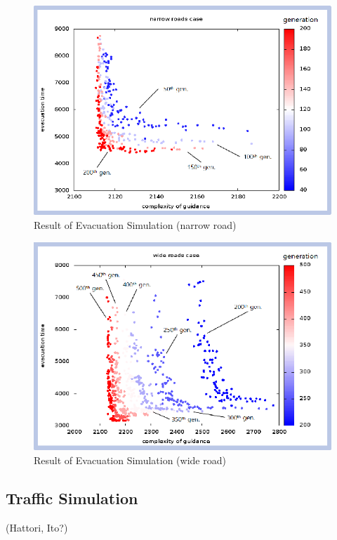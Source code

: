 \begin{figure}
  \centering
  \includegraphics[width=.8\linewidth]{Figs.noda/figure-10.evac_narrow.eps}
  \caption{Result of Evacuation Simulation (narrow road)}
  \label{fig:Figs.noda/figure-10.evac_narrow.eps}
\end{figure}

\begin{figure}
  \centering
  \includegraphics[width=.8\linewidth]{Figs.noda/figure-11.evac_wide.eps}
  \caption{Result of Evacuation Simulation (wide road)}
  \label{fig:Figs.noda/figure-11.evac_wide.eps}
\end{figure}


\subsection{Traffic Simulation}
\label{ss:Traffic Simulation}
(Hattori, Ito?)



